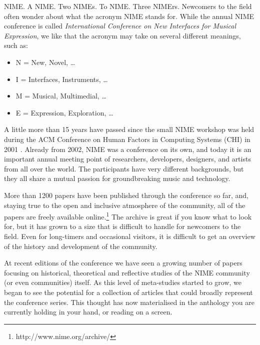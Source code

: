 %
%

\preface

NIME. A NIME. Two NIMEs. To NIME. Three NIMErs. Newcomers to the field often wonder about what the acronym NIME stands for. While the annual NIME conference is called \emph{International Conference on New Interfaces for Musical Expression}, we like that the acronym may take on several different meanings, such as: 

\begin{itemize}
	\item N = New, Novel, \ldots 
	\item I = Interfaces, Instruments, \ldots 
	\item M = Musical, Multimedial, \ldots 
	\item E = Expression, Exploration, \ldots
\end{itemize}

A little more than 15 years have passed since the small NIME workshop was held during the ACM Conference on Human Factors in Computing Systems (CHI) in 2001 \cite{Poupyrev:2001a}. Already from 2002, NIME was a conference on its own, and today it is an important annual meeting point of researchers, developers, designers, and artists from all over the world. The participants have very different backgrounds, but they all share a mutual passion for groundbreaking music and technology. 

More than 1200 papers have been published through the conference so far, and, staying true to the open and inclusive atmosphere of the community, all of the papers are freely available online.\footnote{http://www.nime.org/archive/} The archive is great if you know what to look for, but it has grown to a size that is difficult to handle for newcomers to the field. Even for long-timers and occasional visitors, it is difficult to get an overview of the history and development of the community. 

At recent editions of the conference we have seen a growing number of papers focusing on historical, theoretical and reflective studies of the NIME community (or even communities) itself. As this level of meta-studies started to grow, we began to see the potential for a collection of articles that could broadly represent the conference series. This thought has now materialised in the anthology you are currently holding in your hand, or reading on a screen. 


